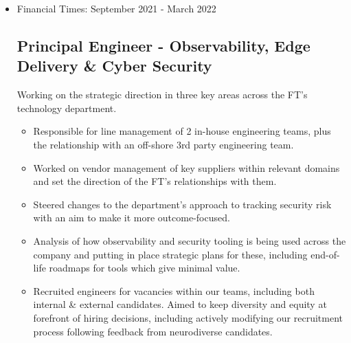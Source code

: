 \documentclass[a4paper]{article}
\newenvironment{detail}{\begin{adjustwidth}{10pt}{}}{\end{adjustwidth}}
\begin{document}
\begin{itemize}
\begin{detail}
\begin{itemize}
	\item Built a central cyber security function, combining a number of teams which had previously reported into different parts of the organisation.
	\item Line managed a team of a dozen people from different disciplines, including Engineers, Risk Analysts and those in IT governance roles.
	\item Steered the direction of Security work across the technology department, and the organisation as a whole.
	\item Worked with a third party consultancy to build a strategic roadmap and help prioritise security initiatives.
	\item Involved in recruitment of a permanent VP of Cyber Security.
\end{itemize}
\end{detail}

\item Financial Times: September 2021 - March 2022
\subsection*{Principal Engineer - Observability, Edge Delivery \& Cyber Security}
\begin{detail}
Working on the strategic direction in three key areas across the FT's technology department.

\begin{itemize}
	\item Responsible for line management of 2 in-house engineering teams, plus the relationship with an off-shore 3rd party engineering team.
	\item Worked on vendor management of key suppliers within relevant domains and set the direction of the FT's relationships with them.
	\item Steered changes to the department's approach to tracking security risk with an aim to make it more outcome-focused.
	\item Analysis of how observability and security tooling is being used across the company and putting in place strategic plans for these, including end-of-life roadmaps for tools which give minimal value.
	\item Recruited engineers for vacancies within our teams, including both internal \& external candidates.  Aimed to keep diversity and equity at forefront of hiring decisions, including actively modifying our recruitment process following feedback from neurodiverse candidates.
\end{itemize}
\end{detail}


\end{itemize}
\end{document}
